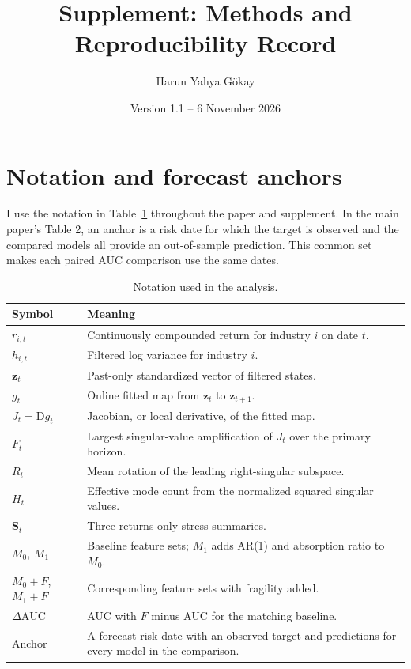 \documentclass[11pt]{article}
\title{Supplement: Methods and Reproducibility Record}
\author{Harun Yahya G\"okay}
\date{Version 1.1 -- 6 November 2026}
\begin{document}
\maketitle
\tableofcontents

\section{Notation and forecast anchors}
I use the notation in Table~\ref{tab:notation} throughout the paper and supplement. In the main paper's Table 2, an anchor is a risk date for which the target is observed and the compared models all provide an out-of-sample prediction. This common set makes each paired AUC comparison use the same dates.

\begin{table}[ht]
\centering
\caption{Notation used in the analysis.}
\label{tab:notation}
\small
\begin{tabular}{@{}lp{4.9in}@{}}
\toprule
Symbol & Meaning \\
\midrule
$r_{i,t}$ & Continuously compounded return for industry $i$ on date $t$. \\
$h_{i,t}$ & Filtered log variance for industry $i$. \\
$\mathbf z_t$ & Past-only standardized vector of filtered states. \\
$g_t$ & Online fitted map from $\mathbf z_t$ to $\mathbf z_{t+1}$. \\
$J_t=\mathrm{D}g_t$ & Jacobian, or local derivative, of the fitted map. \\
$F_t$ & Largest singular-value amplification of $J_t$ over the primary horizon. \\
$R_t$ & Mean rotation of the leading right-singular subspace. \\
$H_t$ & Effective mode count from the normalized squared singular values. \\
$\mathbf S_t$ & Three returns-only stress summaries. \\
$M_0$, $M_1$ & Baseline feature sets; $M_1$ adds AR(1) and absorption ratio to $M_0$. \\
$M_0+F$, $M_1+F$ & Corresponding feature sets with fragility added. \\
$\Delta\mathrm{AUC}$ & AUC with $F$ minus AUC for the matching baseline. \\
Anchor & A forecast risk date with an observed target and predictions for every model in the comparison. \\
\bottomrule
\end{tabular}
\end{table}
\end{document}
